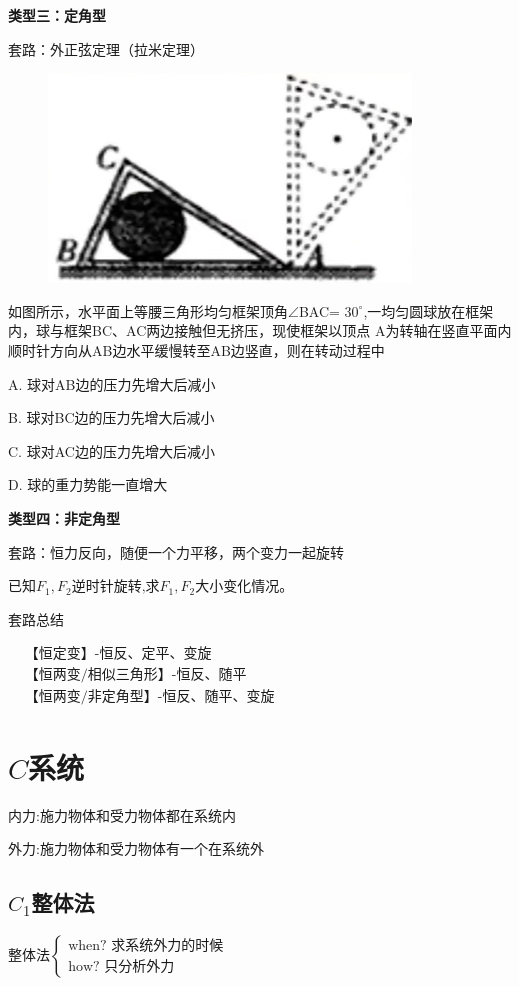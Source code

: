 \documentclass[lang=cn,10pt]{elegantbook}
\begin{document}
	\textbf{类型三：定角型}
	
	套路：外正弦定理（拉米定理）
	\begin{example}
		\begin{figure}[H]
			\centering
			\includegraphics[width=0.4\linewidth]{image/28}
		\end{figure}
		如图所示，水平面上等腰三角形均匀框架顶角$\angle$BAC=
		$30^{\circ}$,一均匀圆球放在框架内，球与框架BC、AC两边接触但无挤压，现使框架以顶点
		A为转轴在竖直平面内顺时针方向从AB边水平缓慢转至AB边竖直，则在转动过程中
		
		A. 球对AB边的压力先增大后减小
		
		B. 球对BC边的压力先增大后减小
		
		C. 球对AC边的压力先增大后减小
		
		D. 球的重力势能一直增大
	\end{example}
	
	\textbf{类型四：非定角型}
	
	套路：恒力反向，随便一个力平移，两个变力一起旋转
	
	\begin{example}
		$\text{已知}F_1\mathrm{,}F_2\text{逆时针旋转,求}F_1\mathrm{,}F_2\text{大小变化情况。}$
	\end{example}
	\vspace{3cm}
	\begin{conclusion}
		套路总结
		
		$\begin{aligned}&\text{【恒定变】-恒反、定平、变旋}\\&\text{【恒两变/相似三角形】-恒反、随平}\\&\text{【恒两变/非定角型】-恒反、随平、变旋}\end{aligned}$
	\end{conclusion}
	\section{$C$系统}
	
	$\text{内力:施力物体和受力物体都在系统内}$ 
	
	$\text{外力:施力物体和受力物体有一个在系统外}$
	\subsection{$C_{1}$整体法}
$	\text{整体法}\begin{cases}\text{when? 求系统外力的时候}\\\text{how? 只分析外力}\end{cases}$
\end{document}
